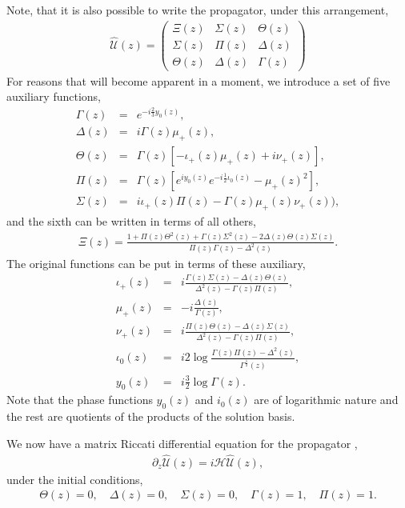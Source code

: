 \documentclass[9pt,twocolumn,twoside]{osajnl}
\begin{document}
Note, that it is also possible to write the propagator, under this arrangement,
\begin{eqnarray}
\hat{\mathcal{U}}(z) = \left( \begin{array}{ccc} 
\Xi(z) & \Sigma(z) & \Theta(z) \\
\Sigma(z) & \Pi(z)    & \Delta(z) \\
\Theta(z) & \Delta(z) & \Gamma(z)
\end{array}  \right)
\end{eqnarray}
For reasons that will become apparent in a moment, we introduce a set of five auxiliary functions,
\begin{eqnarray}
	\Gamma(z) &=& e^{- i \frac{2}{3}  y_{0}(z)}, \\
	\Delta(z)&=& i \Gamma(z) \mu_{+}(z), \\
	\Theta(z)&=& \Gamma(z) \left[ -\iota_{+}(z) \mu_{+}(z) + i \nu_{+}(z) \right], \\
	\Pi(z)&=& \Gamma(z) \left[ e^{i y_0 (z)}e^{-i \frac{1}{2}\iota_0 (z)}
		-\mu_{+} (z)^2 \right], \\	
	\Sigma(z)&=& i \iota_{+}(z) \Pi(z) - \Gamma(z) \mu_{+} (z) \nu_{+}(z)), 
\end{eqnarray}
and the sixth can be written in terms of all others,  
\begin{eqnarray}
\Xi(z) = \frac{1 + \Pi(z) \Theta^{2}(z) + \Gamma(z) \Sigma^{2}(z)- 2 \Delta(z) \Theta(z) \Sigma(z)}{ \Pi(z) \Gamma(z) - \Delta^{2}(z)}.
\end{eqnarray}
The original functions can be put in terms of these auxiliary,
\begin{eqnarray}
\iota_{+}(z) &=& i \frac{\Gamma(z)\Sigma(z) - \Delta(z)\Theta(z)}{\Delta^2(z)-\Gamma(z)\Pi(z)}, \\
\mu_{+}(z) &=& -i \frac{\Delta(z)}{\Gamma(z)},\\
\nu_{+}(z) &=& i \frac{\Pi(z)\Theta(z) - \Delta(z)\Sigma(z)}{\Delta^2(z)-\Gamma(z)\Pi(z)} ,\\
\iota_{0}(z) &=& i 2 \log \frac{\Gamma(z) \Pi(z) - \Delta^{2}(z)}{\Gamma^{\frac{1}{2}}(z) } , \\
y_{0}(z) &=& i \frac{3}{2} \log \Gamma(z) .
\end{eqnarray}
Note that the phase functions $y_0(z)$ and $i_0(z)$ are of logarithmic nature and the rest are quotients of the products of the solution basis. 


We now have a matrix Riccati differential equation for the propagator \cite{Reid1939p414,Levin1959p519}, 
\begin{eqnarray}
\partial_{z} \hat{\mathcal{U}}(z) = i \mathcal{H} \hat{\mathcal{U}}(z) ,
\end{eqnarray}
under the initial conditions, 
\begin{eqnarray}
\Theta(z)= 0 , \quad \Delta(z) =  0, \quad \Sigma(z)= 0, \quad
\Gamma(z)= 1, \quad \Pi(z)= 1. \label{eq:initsb}
\end{eqnarray}
\end{document}
